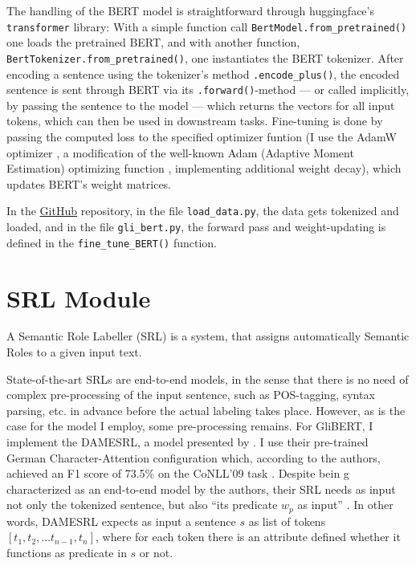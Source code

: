 The handling of the BERT model is straightforward through huggingface's \texttt{transformer}
library: With a simple function call \texttt{BertModel.from\_pretrained()} one loads the
pretrained BERT, and with another function, \texttt{BertTokenizer.from\_pretrained()},
one instantiates the BERT tokenizer.
After encoding a sentence using the tokenizer's method \texttt{.encode\_plus()}, the
encoded sentence is sent through BERT via its \texttt{.forward()}-method --- or
called implicitly, by passing the sentence to the model --- which returns the
vectors for all input tokens, which can then be used in downstream tasks. Fine-tuning
is done by passing the computed loss to the specified optimizer funtion (I use the
AdamW optimizer \citep{loshchilov2019decoupled}, a modification of the well-known
Adam (Adaptive Moment Estimation) optimizing function \citep{kingma2014adam}, implementing
additional weight decay), which updates BERT's weight matrices.

In the \href{https://github.com/JonathanSchaber/Masterarbeit}{GitHub} repository, in
the file \texttt{load\_data.py}, the data gets tokenized and loaded, and in
the file \texttt{gli\_bert.py}, the forward pass and weight-updating is
defined in the \texttt{fine\_tune\_BERT()} function.


\section{SRL Module}
\label{sec:srl-module}

A Semantic Role Labeller (SRL) is a system, that assigns automatically Semantic Roles to a
given input text.

State-of-the-art SRLs are end-to-end models, in the sense that there is no need of
complex pre-processing of the input sentence, such as POS-tagging, syntax parsing, etc.
in advance before the actual labeling takes place. However, as is the case for the model
I employ, some pre-processing remains. For GliBERT, I implement the DAMESRL, a model
presented by \cite{do2018flexible}. I use their pre-trained German Character-Attention
configuration which, according to the authors, achieved an F1 score of 73.5\% on the
CoNLL'09 task \citep{hajivc2009conll}. Despite bein g characterized as an end-to-end
model by the authors, their SRL needs as input not only the tokenized sentence, but also
``its predicate $w_p$ as input'' \citep{do2018flexible}. In other words, DAMESRL expects
as input a sentence $s$ as list of tokens $[ t_1, t_2, \dotsc t_{n-1}, t_n ]$, where for
each token there is an attribute defined whether it functions as predicate in $s$ or
not.

